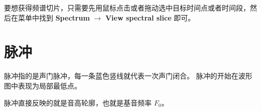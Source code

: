 要想获得频谱切片，只需要先用鼠标点击或者拖动选中目标时间点或者时间段，然后在菜单中找到 \textbf{Spectrum} $\rightarrow$ \textbf{View spectral slice} 即可。

\section{脉冲}
脉冲指的是声门脉冲，每一条蓝色竖线就代表一次声门闭合。
脉冲的开始在波形图中表现为局部最低点。

脉冲直接反映的就是音高轮廓，也就是基音频率 $F_0$。
